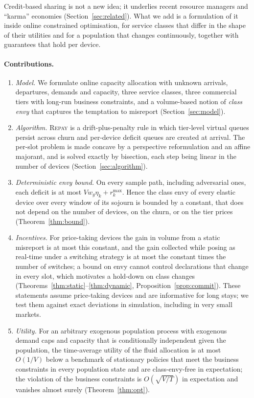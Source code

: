 \documentclass[preprint,11pt]{elsarticle}
\theoremstyle{definition}
\theoremstyle{remark}
\newcommand{\rmax}{r^{\max}}
\newcommand{\repay}{\textsc{Repay}}
\begin{document}
Credit-based sharing is not a new idea; it underlies recent resource managers and ``karma'' economies (Section~\ref{sec:related}).
What we add is a formulation of it inside online constrained optimisation, for service classes that differ in the shape of their utilities and for a population that changes continuously, together with guarantees that hold per device.

\paragraph{Contributions.}
\begin{enumerate}[leftmargin=*,itemsep=2pt]
\item \emph{Model.} We formulate online capacity allocation with unknown arrivals, departures, demands and capacity, three service classes, three commercial tiers with long-run business constraints, and a volume-based notion of \emph{class envy} that captures the temptation to misreport (Section~\ref{sec:model}).
\item \emph{Algorithm.} \repay{} is a drift-plus-penalty rule in which tier-level virtual queues persist across churn and per-device deficit queues are created at arrival. The per-slot problem is made concave by a perspective reformulation and an affine majorant, and is solved exactly by bisection, each step being linear in the number of devices (Section~\ref{sec:algorithm}).
\item \emph{Deterministic envy bound.} On every sample path, including adversarial ones, each deficit is at most $V w_g\eta_k+\rmax_k$. Hence the class envy of every elastic device over every window of its sojourn is bounded by a constant, that does not depend on the number of devices, on the churn, or on the tier prices (Theorem~\ref{thm:bound}).
\item \emph{Incentives.} For price-taking devices the gain in volume from a static misreport is at most this constant, and the gain collected while posing as real-time under a switching strategy is at most the constant times the number of switches; a bound on envy cannot control declarations that change in every slot, which motivates a hold-down on class changes (Theorems~\ref{thm:static}--\ref{thm:dynamic}, Proposition~\ref{prop:commit}). These statements assume price-taking devices and are informative for long stays; we test them against exact deviations in simulation, including in very small markets.
\item \emph{Utility.} For an arbitrary exogenous population process with exogenous demand caps and capacity that is conditionally independent given the population, the time-average utility of the fluid allocation is at most $O(1/V)$ below a benchmark of stationary policies that meet the business constraints in every population state and are class-envy-free in expectation; the violation of the business constraints is $O(\sqrt{V/T})$ in expectation and vanishes almost surely (Theorem~\ref{thm:opt}).

\end{enumerate}
\end{document}
